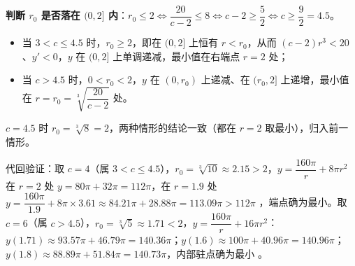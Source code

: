 \begin{answer}
\textbf{判断 $r_0$ 是否落在 $(0,2]$ 内}：$r_0\leqslant2\iff\dfrac{20}{c-2}\leqslant8\iff c-2\geqslant\dfrac52\iff c\geqslant\dfrac92=4.5$。

\begin{itemize}
\item 当 $3<c\leqslant4.5$ 时，$r_0\geqslant2$，即在 $(0,2]$ 上恒有 $r<r_0$，从而 $(c-2)r^3<20$、$y'<0$，$y$ 在 $(0,2]$ 上单调递减，最小值在右端点 $r=2$ 处；
\item 当 $c>4.5$ 时，$0<r_0<2$，$y$ 在 $(0,r_0)$ 上递减、在 $(r_0,2]$ 上递增，最小值在 $r=r_0=\sqrt[3]{\dfrac{20}{c-2}}$ 处。
\end{itemize}

$c=4.5$ 时 $r_0=\sqrt[3]{8}=2$，两种情形的结论一致（都在 $r=2$ 取最小），归入前一情形。

代回验证：取 $c=4$（属 $3<c\leqslant4.5$），$r_0=\sqrt[3]{10}\approx2.15>2$，$y=\dfrac{160\pi}{r}+8\pi r^2$ 在 $r=2$ 处 $y=80\pi+32\pi=112\pi$，在 $r=1.9$ 处 $y=\dfrac{160\pi}{1.9}+8\pi\times3.61\approx84.21\pi+28.88\pi=113.09\pi>112\pi$ ，端点确为最小。取 $c=6$（属 $c>4.5$），$r_0=\sqrt[3]{5}\approx1.71<2$，$y=\dfrac{160\pi}{r}+16\pi r^2$：$y(1.71)\approx93.57\pi+46.79\pi=140.36\pi$；$y(1.6)\approx100\pi+40.96\pi=140.96\pi$；$y(1.8)\approx88.89\pi+51.84\pi=140.73\pi$，内部驻点确为最小 。



\end{answer}

